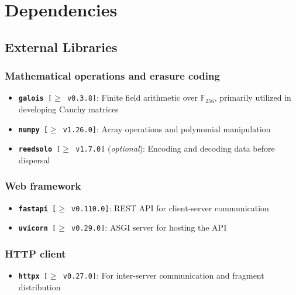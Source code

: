 \documentclass[../veristore_security_model.tex]{subfiles}
\begin{document}
\section{Dependencies}


\subsection{External Libraries}

\subsubsection*{Mathematical operations and erasure coding}
\begin{itemize}
    \item \texttt{\textbf{galois} [$\geq$ v0.3.8]}: Finite field arithmetic over $\mathbb{F}_{256}$, primarily utilized in developing Cauchy matrices
    \item \texttt{\textbf{numpy} [$\geq$ v1.26.0]}: Array operations and polynomial manipulation
    \item \texttt{\textbf{reedsolo} [$\geq$ v1.7.0]} (\textit{optional}): Encoding and decoding data before dispersal
\end{itemize}

\subsubsection*{Web framework}
\begin{itemize}
    \item \texttt{\textbf{fastapi} [$\geq$ v0.110.0]}: REST API for client-server communication
    \item \texttt{\textbf{uvicorn} [$\geq$ v0.29.0]}: ASGI server for hosting the API
\end{itemize}

\subsubsection*{HTTP client}
\begin{itemize}
    \item \texttt{\textbf{httpx} [$\geq$ v0.27.0]}: For inter-server communication and fragment distribution
\end{itemize}
\end{document}
